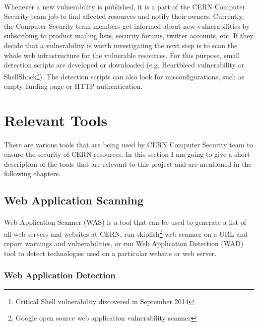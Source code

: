 \paragraph{}
Whenever a new vulnerability is published, it is a part of the CERN Computer Security team job to find affected resources and notify their owners. Currently, the Computer Security team members get informed about new vulnerabilities by subscribing to product mailing lists, security forums, twitter accounts, etc. If they decide that a vulnerability is worth investigating the next step is to scan the whole web infrastructure for the vulnerable resources. For this purpose, small detection scripts are developed or downloaded (e.g. Heartbleed vulnerability or ShellShock\footnote{Critical Shell vulnerability discovered in September 2014}). The detection scripts can also look for misconfigurations, such as empty landing page or HTTP authentication. 


\section{Relevant Tools}
\label{sec:tools}
\paragraph{}
There are various tools that are being used by CERN Computer Security team to ensure the security of CERN resources. In this section I am going to give a short description of the tools that are relevant to this project and are mentioned in the following chapters. 
\subsection{Web Application Scanning} 
\paragraph{}
Web Application Scanner (WAS) is a tool that can be used to generate a list of all web servers and websites at CERN, run skipfish\footnote{Google open source web application vulnerability scanner} web scanner on a URL and report warnings and vulnerabilities, or run Web Application Detection (WAD) tool to detect technologies used on a particular website or web server.
\subsubsection{Web Application Detection}
